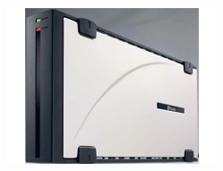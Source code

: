 \documentclass[cjk,dvipdfmx,12pt]{beamer}
\begin{document}
\begin{frame}
\begin{minipage}[t]{0.4\hsize}
  \includegraphics[width=1.0\hsize]{image200705/PX-EH16L.png}
 \end{minipage} 

\end{frame}
\end{document}
